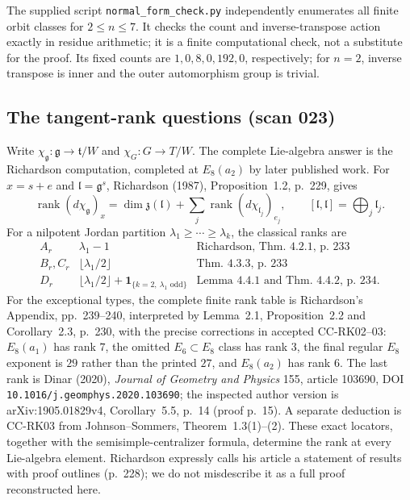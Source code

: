 The supplied script \texttt{normal\_form\_check.py} independently
enumerates all finite orbit classes for $2\leq n\leq7$.  It checks
the count and inverse-transpose action exactly in residue arithmetic;
it is a finite computational check, not a substitute for the proof.
Its fixed counts are $1,0,8,0,192,0$, respectively; for $n=2$,
inverse transpose is inner and the outer automorphism group is trivial.

\subsection{The tangent-rank questions (scan 023)}
Write $\chi_{\mathfrak g}:\mathfrak g\to\mathfrak t/W$ and
$\chi_G:G\to T/W$.  The complete Lie-algebra answer is the
Richardson computation, completed at $E_8(a_2)$ by later published
work.  For $x=s+e$ and $\mathfrak l=\mathfrak g^s$,
Richardson (1987), Proposition~1.2, p.~229, gives
\[
 \operatorname{rank}(d\chi_{\mathfrak g})_x
 =\dim\mathfrak z(\mathfrak l)+
   \sum_j\operatorname{rank}(d\chi_{\mathfrak l_j})_{e_j},
 \qquad [\mathfrak l,\mathfrak l]=\bigoplus_j\mathfrak l_j.
\]
For a nilpotent Jordan partition $\lambda_1\geq\cdots\geq\lambda_k$,
the classical ranks are
\[
\begin{array}{c|c|l}
 A_r&\lambda_1-1&\text{Richardson, Thm.~4.2.1, p.~233}\\
 B_r,C_r&\lfloor\lambda_1/2\rfloor&\text{Thm.~4.3.3, p.~233}\\
 D_r&\lfloor\lambda_1/2\rfloor+
     \mathbf1_{\{k=2,\ \lambda_1\text{ odd}\}}&
     \text{Lemma~4.4.1 and Thm.~4.4.2, p.~234}.
\end{array}
\]
For the exceptional types, the complete finite rank table is
Richardson's Appendix, pp.~239--240, interpreted by Lemma~2.1,
Proposition~2.2 and Corollary~2.3, p.~230, with the precise corrections
in accepted CC-RK02--03: $E_8(a_1)$ has rank $7$, the omitted
$E_6\subset E_8$ class has rank $3$, the final regular $E_8$
exponent is $29$ rather than the printed $27$, and $E_8(a_2)$ has
rank $6$.  The last rank is Dinar (2020), \emph{Journal of Geometry and Physics}
155, article 103690, DOI \texttt{10.1016/j.geomphys.2020.103690};
the inspected author version is arXiv:1905.01829v4,
Corollary~5.5, p.~14 (proof p.~15).  A separate deduction is
CC-RK03 from Johnson--Sommers, Theorem~1.3(1)--(2).
These exact locators, together with the semisimple-centralizer formula,
determine the rank at every Lie-algebra element.  Richardson expressly
calls his article a statement of results with proof outlines (p.~228);
we do not misdescribe it as a full proof reconstructed here.

